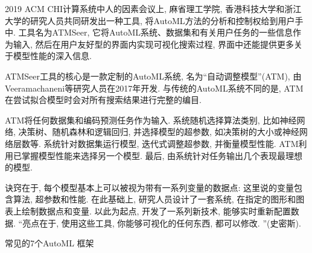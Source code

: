 2019 ACM CHI计算系统中人的因素会议上, 麻省理工学院, 香港科技大学和浙江大学的研究人员共同研发出一种工具, 将AutoML方法的分析和控制权给到用户手中.
工具名为ATMSeer, 它将AutoML系统、数据集和有关用户任务的一些信息作为输入, 然后在用户友好型的界面内实现可视化搜索过程, 界面中还能提供更多关于模型性能的深入信息.

ATMSeer工具的核心是一款定制的AutoML系统, 名为“自动调整模型”(ATM), 由Veeramachaneni等研究人员在2017年开发. 与传统的AutoML系统不同的是, ATM在尝试拟合模型时会对所有搜索结果进行完整的编目.

ATM将任何数据集和编码预测任务作为输入. 系统随机选择算法类别, 比如神经网络, 决策树、随机森林和逻辑回归, 并选择模型的超参数, 如决策树的大小或神经网络层数等.
系统针对数据集运行模型, 迭代式调整超参数, 并衡量模型性能. ATM利用已掌握模型性能来选择另一个模型. 最后, 由系统针对任务输出几个表现最理想的模型.

诀窍在于, 每个模型基本上可以被视为带有一系列变量的数据点: 这里说的变量包含算法, 超参数和性能. 在此基础上, 研究人员设计了一套系统, 在指定的图形和图表上绘制数据点和变量. 以此为起点, 开发了一系列新技术, 能够实时重新配置数据.  “亮点在于, 使用这些工具, 你能够可视化的任何东西, 都可以修改. ”(史密斯).

常见的7个AutoML 框架

